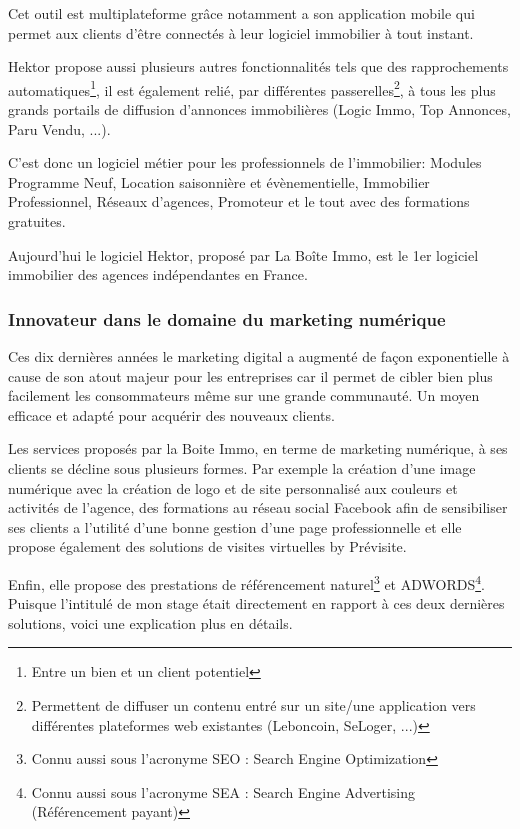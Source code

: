 \documentclass[12pt]{article}
\begin{document}
Cet outil est multiplateforme grâce notamment a son application  mobile qui permet aux clients d'être connectés à leur logiciel immobilier à tout instant.

Hektor propose aussi plusieurs autres fonctionnalités tels que des rapprochements automatiques\footnote{Entre un bien et un client potentiel}, il est également relié, par différentes passerelles\footnote{Permettent de diffuser un contenu entré sur un site/une application vers différentes plateformes web existantes (Leboncoin, SeLoger, ...)}, à tous les plus grands portails de diffusion d'annonces immobilières (Logic Immo, Top Annonces, Paru Vendu, ...). 

C'est donc un logiciel métier pour les professionnels de l'immobilier: Modules Programme Neuf, Location saisonnière et évènementielle, Immobilier Professionnel, Réseaux d'agences, Promoteur et le tout avec des formations gratuites.

Aujourd'hui le logiciel Hektor, proposé par La Boîte Immo, est le 1er logiciel immobilier des agences indépendantes en France.

\newpage
\subsubsection{Innovateur dans le domaine du marketing numérique}

Ces dix dernières années le marketing digital a augmenté de façon exponentielle à cause de son atout majeur pour les entreprises car il permet de cibler bien plus facilement les consommateurs même sur une grande communauté. Un moyen efficace et adapté pour acquérir des nouveaux clients.

Les services proposés par la Boite Immo, en terme de marketing numérique, à ses clients se décline sous plusieurs formes. Par exemple la création d'une image numérique avec la création de logo et de site personnalisé aux couleurs et activités de l'agence, des formations au réseau social Facebook afin de sensibiliser ses clients a l'utilité d'une bonne gestion d'une page professionnelle et elle propose également des solutions de visites virtuelles by Prévisite.

Enfin, elle propose des prestations de référencement naturel\footnote{Connu aussi sous l'acronyme SEO : Search Engine Optimization} et ADWORDS\footnote{Connu aussi sous l'acronyme SEA : Search Engine Advertising (Référencement payant)}. Puisque l'intitulé de mon stage était directement en rapport à ces deux dernières solutions, voici une explication plus en détails.
\end{document}
